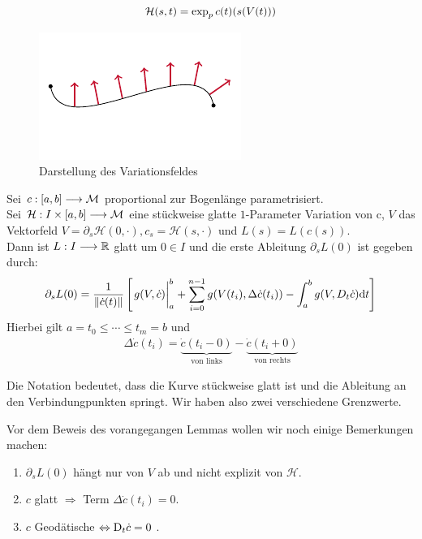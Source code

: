 \begin{bew}
\begin{align*}
\mathcal{H}(s, t) = \operatorname{exp}_p{c(t)}(s(V(t)))
\end{align*}
\end{bew}
\begin{figure}[H]
\centering
\includegraphics[width=0.45\linewidth]{figures/tikz/variation_field.pdf}
\caption{Darstellung des Variationsfeldes}
\label{img:variation_field}
\end{figure}
\begin{satz}
Sei $c:[a, b] \longrightarrow \mathcal{M}$ proportional zur Bogenlänge parametrisiert. \\
Sei $\mathcal{H}: I \times [a, b] \longrightarrow \mathcal{M}$ eine stückweise glatte $1$-Parameter Variation von c, $V$ das Vektorfeld $V=\partial_s\mathcal{H}(0,\cdot), c_s=\mathcal{H}(s,\cdot)$ und $L(s) = L(c(s))$. \\
Dann ist $L: I \longrightarrow \mathbb{R}$ glatt um $0 \in I$ und die erste Ableitung $\partial_sL(0)$ ist gegeben durch:
\begin{align*}
\partial_sL(0) = \frac{1}{\norm{\dot{c}(t)}}\left[\eval{g(V,\dot{c})}_{a}^{b} + \sum_{i=0}^{n-1}g(V(t_i),\Delta\dot{c}(t_i))- \int_{a}^{b}g(V,D_t\dot{c})\dd t\right]
\end{align*}
Hierbei gilt $a=t_0 \leq \cdots \leq t_m=b $ und 
\begin{align*}
\Delta\dot{c}(t_i) = \underbrace{\dot{c}(t_i-0)}_{\text{von links}} - \underbrace{\dot{c}(t_i+0)}_{\text{von rechts}}
\end{align*}
\end{satz}
Die Notation bedeutet, dass die Kurve stückweise glatt ist und die Ableitung an den Verbindungpunkten  springt. Wir haben also zwei verschiedene Grenzwerte.
\begin{bem}
Vor dem Beweis des vorangegangen Lemmas wollen wir noch einige Bemerkungen machen:
\begin{enumerate}
\item $\partial_sL(0)$ hängt nur von $V$ ab und nicht explizit von $\mathcal{H}$.
\item $c$ glatt $\Rightarrow$ Term $\Delta\dot{c}(t_i)=0$.
\item $c $ Geodätische $\Leftrightarrow \mathrm{D}_t\dot{c} = 0$ .
\end{enumerate}
\end{bem}
